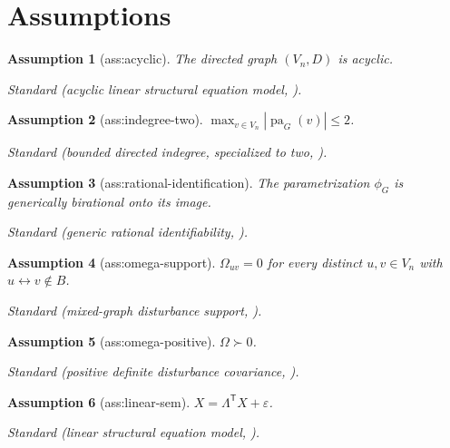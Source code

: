 \documentclass{article}
\newtheorem{assumption}{Assumption}
\begin{document}
\section{Assumptions}

\begin{assumption}[ass:acyclic]\label{ass:acyclic}
The directed graph \((V_n,D)\) is acyclic.
\par\smallskip\noindent\emph{Standard} (acyclic linear structural equation model, \cite{FoygelDraismaDrton2012}).
\end{assumption}

\begin{assumption}[ass:indegree-two]\label{ass:indegree-two}
\(\max_{v\in V_n}|\operatorname{pa}_G(v)|\le2\).
\par\smallskip\noindent\emph{Standard} (bounded directed indegree, specialized to two, \cite{HolleringMisraSturma2026}).
\end{assumption}

\begin{assumption}[ass:rational-identification]\label{ass:rational-identification}
The parametrization \(\phi_G\) is generically birational onto its image.
\par\smallskip\noindent\emph{Standard} (generic rational identifiability, \cite{HolleringMisraSturma2026}).
\end{assumption}

\begin{assumption}[ass:omega-support]\label{ass:omega-support}
\(\Omega_{uv}=0\) for every distinct \(u,v\in V_n\) with \(u\leftrightarrow v\notin B\).
\par\smallskip\noindent\emph{Standard} (mixed-graph disturbance support, \cite{FoygelDraismaDrton2012}).
\end{assumption}

\begin{assumption}[ass:omega-positive]\label{ass:omega-positive}
\(\Omega\succ0\).
\par\smallskip\noindent\emph{Standard} (positive definite disturbance covariance, \cite{FoygelDraismaDrton2012}).
\end{assumption}

\begin{assumption}[ass:linear-sem]\label{ass:linear-sem}
\(X=\Lambda^{\mathsf T}X+\varepsilon\).
\par\smallskip\noindent\emph{Standard} (linear structural equation model, \cite{FoygelDraismaDrton2012}).
\end{assumption}
\end{document}
